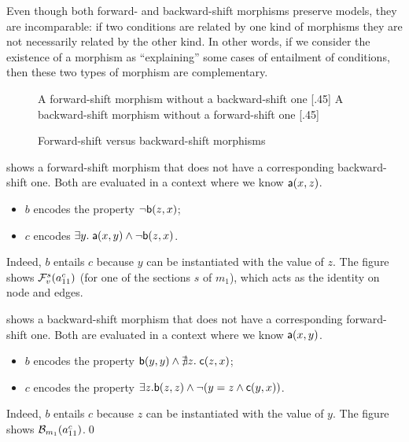 \medskip\noindent
Even though both forward- and backward-shift morphisms preserve models, they are incomparable: if two conditions are related by one kind of morphisms they are not necessarily related by the other kind. In other words, if we consider the existence of a morphism as ``explaining'' some cases of entailment of conditions, then these two types of morphism are complementary.
%
\begin{figure}[t]
\centering
\subcaptionbox
  {A forward-shift morphism without a backward-shift one
  }
  [.45\textwidth]
  {}
  \qquad
\subcaptionbox
  {A backward-shift morphism without a forward-shift one
  }
  [.45\textwidth]
  {}
\caption{Forward-shift versus backward-shift morphisms}
\end{figure}
%
\begin{example}
 shows a forward-shift morphism that does not have a corresponding backward-shift one. Both are evaluated in a context where we know $\mathsf{a}(x,z)$.
\begin{itemize}
\item $b$ encodes the property $\neg \mathsf{b}(z,x)$;
\item $c$ encodes $\exists y.\; \mathsf{a}(x,y) \wedge \neg \mathsf{b}(z,x)$.
\end{itemize}
Indeed, $b$ entails $c$ because $y$ can be instantiated with the value of $z$. The figure shows $\mathcal{F}_v^s(a^c_{11})$ (for one of the sections $s$ of $m_1$), which acts as the identity on node and edges.

 shows a backward-shift morphism that does not have a corresponding forward-shift one. Both are evaluated in a context where we know $\mathsf{a}(x,y)$.
\begin{itemize}
\item $b$ encodes the property $\mathsf{b}(y,y) \wedge \nexists z.\; \mathsf{c}(z,x)$;
\item $c$ encodes the property $\exists z.\mathsf{b}(z,z) \wedge \neg(y=z \wedge \mathsf{c}(y,x))$.
\end{itemize}
Indeed, $b$ entails $c$ because $z$ can be instantiated with the value of $y$. The figure shows $\mathcal{B}_{m_1}(a^c_{11})$.\qed
\end{example}
%
